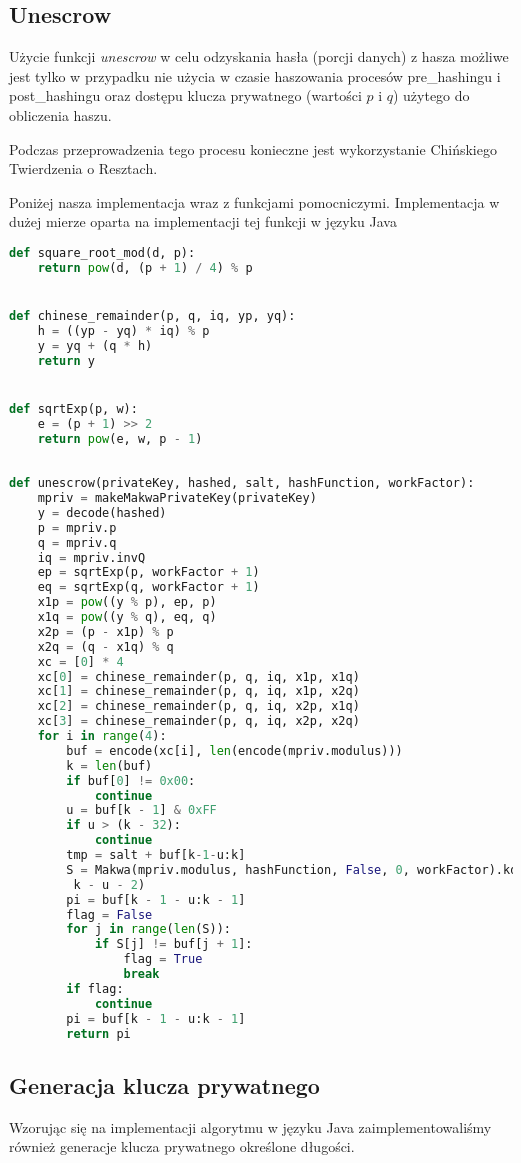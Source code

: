 \documentclass[a4paper,titleauthor]{mwart}
\begin{document}
\subsection{Unescrow}
Użycie funkcji \textit{unescrow} w celu odzyskania hasła (porcji danych) z hasza możliwe jest tylko w przypadku nie użycia w czasie haszowania procesów pre\_hashingu i post\_hashingu oraz dostępu klucza prywatnego (wartości $p$ i $q$) użytego do obliczenia haszu.

Podczas przeprowadzenia tego procesu konieczne jest wykorzystanie Chińskiego Twierdzenia o Resztach.

Poniżej nasza implementacja wraz z funkcjami pomocniczymi. Implementacja w dużej mierze oparta na implementacji tej funkcji w języku Java
\begin{lstlisting}[language=Python]
def square_root_mod(d, p):
	return pow(d, (p + 1) / 4) % p


def chinese_remainder(p, q, iq, yp, yq):
	h = ((yp - yq) * iq) % p
	y = yq + (q * h)
	return y


def sqrtExp(p, w):
	e = (p + 1) >> 2
	return pow(e, w, p - 1)
	
	
def unescrow(privateKey, hashed, salt, hashFunction, workFactor):
	mpriv = makeMakwaPrivateKey(privateKey)
	y = decode(hashed)
	p = mpriv.p
	q = mpriv.q
	iq = mpriv.invQ
	ep = sqrtExp(p, workFactor + 1)
	eq = sqrtExp(q, workFactor + 1)
	x1p = pow((y % p), ep, p)
	x1q = pow((y % q), eq, q)
	x2p = (p - x1p) % p
	x2q = (q - x1q) % q
	xc = [0] * 4
	xc[0] = chinese_remainder(p, q, iq, x1p, x1q)
	xc[1] = chinese_remainder(p, q, iq, x1p, x2q)
	xc[2] = chinese_remainder(p, q, iq, x2p, x1q)
	xc[3] = chinese_remainder(p, q, iq, x2p, x2q)
	for i in range(4):
		buf = encode(xc[i], len(encode(mpriv.modulus)))
		k = len(buf)
		if buf[0] != 0x00:
			continue
		u = buf[k - 1] & 0xFF
		if u > (k - 32):
			continue
		tmp = salt + buf[k-1-u:k]
		S = Makwa(mpriv.modulus, hashFunction, False, 0, workFactor).kdf(tmp, /
		 k - u - 2)
		pi = buf[k - 1 - u:k - 1]
		flag = False
		for j in range(len(S)):
			if S[j] != buf[j + 1]:
				flag = True
				break
		if flag:
			continue
		pi = buf[k - 1 - u:k - 1]
		return pi
\end{lstlisting}
\subsection{Generacja klucza prywatnego}
Wzorując się na implementacji algorytmu w języku Java  zaimplementowaliśmy również generacje klucza prywatnego określone długości.
\end{document}

